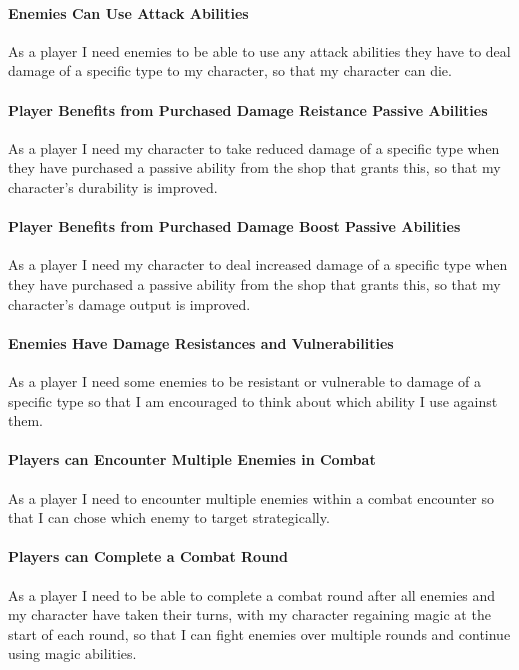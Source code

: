 \paragraph{Enemies Can Use Attack Abilities}
As a player I need enemies to be able to use any attack abilities they have to deal damage of a specific type to my character, so that my character can die.

\paragraph{Player Benefits from Purchased Damage Reistance Passive Abilities}
As a player I need my character to take reduced damage of a specific type when they have purchased a passive ability from the shop that grants this, so that my character's durability is improved.

\paragraph{Player Benefits from Purchased Damage Boost Passive Abilities}
As a player I need my character to deal increased damage of a specific type when they have purchased a passive ability from the shop that grants this, so that my character's damage output is improved.

\paragraph{Enemies Have Damage Resistances and Vulnerabilities}
As a player I need some enemies to be resistant or vulnerable to damage of a specific type so that I am encouraged to think about which ability I use against them.

\paragraph{Players can Encounter Multiple Enemies in Combat}
As a player I need to encounter multiple enemies within a combat encounter so that I can chose which enemy to target strategically.

\paragraph{Players can Complete a Combat Round}
As a player I need to be able to complete a combat round after all enemies and my character have taken their turns, with my character regaining magic at the start of each round, so that I can fight enemies over multiple rounds and continue using magic abilities.

